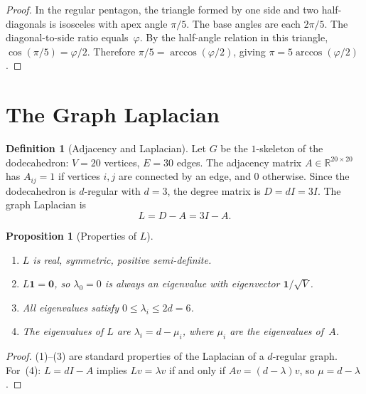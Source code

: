 \documentclass[11pt,a4paper]{article}
\theoremstyle{plain}
\newtheorem{proposition}[theorem]{Proposition}
\theoremstyle{definition}
\newtheorem{definition}[theorem]{Definition}
\newcommand{\vp}{\varphi}
\newcommand{\R}{\mathbb{R}}
\begin{document}
\begin{proof}
In the regular pentagon, the triangle formed by one side and two
half-diagonals is isosceles with apex angle $\pi/5$.  The base angles
are each $2\pi/5$.  The diagonal-to-side ratio equals~$\vp$.  By the
half-angle relation in this triangle, $\cos(\pi/5) = \vp/2$.
Therefore $\pi/5 = \arccos(\vp/2)$, giving $\pi = 5\arccos(\vp/2)$.
\end{proof}

\section{The Graph Laplacian}\label{sec:laplacian}

\begin{definition}[Adjacency and Laplacian]\label{def:laplacian}
Let $G$ be the $1$-skeleton of the dodecahedron: $V = 20$ vertices,
$E = 30$ edges.  The adjacency matrix $A \in \R^{20 \times 20}$ has
$A_{ij} = 1$ if vertices $i,j$ are connected by an edge, and $0$
otherwise.  Since the dodecahedron is $d$-regular with $d = 3$, the
degree matrix is $D = dI = 3I$.  The graph Laplacian is
\[
  L = D - A = 3I - A.
\]
\end{definition}

\begin{proposition}[Properties of $L$]\label{prop:L-props}
\leavevmode
\begin{enumerate}[nosep]
  \item $L$ is real, symmetric, positive semi-definite.
  \item $L\mathbf{1} = \mathbf{0}$, so $\lambda_0 = 0$ is always an
    eigenvalue with eigenvector $\mathbf{1}/\sqrt{V}$.
  \item All eigenvalues satisfy $0 \le \lambda_i \le 2d = 6$.
  \item The eigenvalues of $L$ are $\lambda_i = d - \mu_i$, where
    $\mu_i$ are the eigenvalues of~$A$.
\end{enumerate}
\end{proposition}

\begin{proof}
(1)--(3) are standard properties of the Laplacian of a $d$-regular
graph.  For~(4): $L = dI - A$ implies $Lv = \lambda v$ if and only if
$Av = (d - \lambda)v$, so $\mu = d - \lambda$.
\end{proof}
\end{document}
